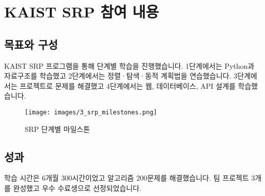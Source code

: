 \section{KAIST SRP 참여 내용}

\subsection{목표와 구성}
KAIST SRP 프로그램을 통해 단계별 학습을 진행했습니다. 1단계에서는 Python과 자료구조를 학습했고 2단계에서는 정렬·탐색·동적 계획법을 연습했습니다. 3단계에서는 프로젝트로 문제를 해결했고 4단계에서는 웹, 데이터베이스, API 설계를 학습했습니다.

\begin{figure}[h]
    \texttt{[image: images/3\_srp\_milestones.png]}
    \caption{SRP 단계별 마일스톤}
    \label{fig:srp_milestones}
\end{figure}

\subsection{성과}
학습 시간은 6개월 300시간이었고 알고리즘 200문제를 해결했습니다. 팀 프로젝트 3개를 완성했고 우수 수료생으로 선정되었습니다.

